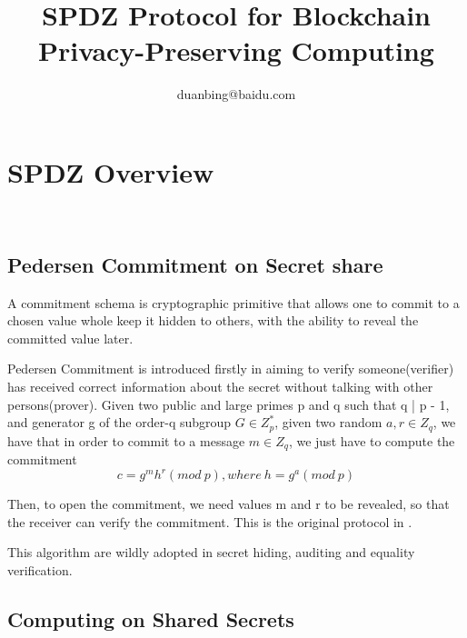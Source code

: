 \documentclass[a4paper,11pt]{article}
\author{duanbing@baidu.com}
\title{SPDZ Protocol for Blockchain Privacy-Preserving Computing}
\begin{document}
\maketitle  
\tableofcontents


\section{SPDZ Overview}
  

\subsection{Pedersen Commitment on Secret share}

A commitment schema is cryptographic primitive that allows one to commit to a chosen value whole keep it hidden to others, with the ability to reveal the committed value later.

Pedersen Commitment is introduced firstly in \cite{pedersen1991non} aiming to verify someone(verifier) has received correct information about the secret without talking with other persons(prover). 
Given two public and large primes p and q such that q | p - 1, and generator g of the order-q subgroup $G \in  Z_p^{*}$, given two random $a, r \in Z_q$, we have that in order to commit to a message $m \in Z_q$, we just have to compute the commitment
\begin{equation}
c = g^m h^r (mod\ p), where\ h = g^a(mod\ p) 
\end{equation}

Then, to open the commitment, we need values m and r to be revealed, so that the receiver can verify the commitment.    This is the original protocol in  \cite{pedersen1991non}.  

 



 This algorithm are wildly adopted in secret hiding, auditing and equality verification.
\subsection {Computing on Shared Secrets} 






\end{document}
